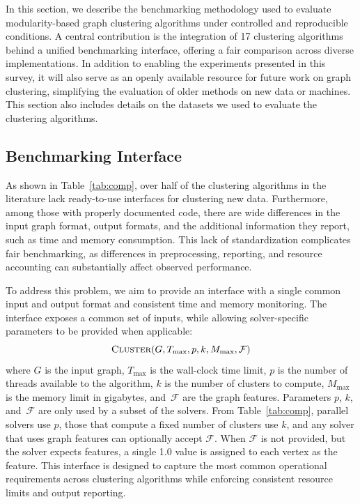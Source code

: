 \documentclass[../paper.tex]{subfiles}
\begin{document}
In this section, we describe the benchmarking methodology used to evaluate modularity-based graph clustering algorithms under controlled and reproducible conditions. A central contribution is the integration of 17 clustering algorithms behind a unified benchmarking interface, offering a fair comparison across diverse implementations. In addition to enabling the experiments presented in this survey, it will also serve as an openly available resource for future work on graph clustering, simplifying the evaluation of older methods on new data or machines. This section also includes details on the datasets we used to evaluate the clustering algorithms.

\subsection{Benchmarking Interface}

As shown in Table~\ref{tab:comp}, over half of the clustering algorithms in the literature lack ready-to-use interfaces for clustering new data. Furthermore, among those with properly documented code, there are wide differences in the input graph format, output formats, and the additional information they report, such as time and memory consumption. This lack of standardization complicates fair benchmarking, as differences in preprocessing, reporting, and resource accounting can substantially affect observed performance.

To address this problem, we aim to provide an interface with a single common input and output format and consistent time and memory monitoring. The interface exposes a common set of inputs, while allowing solver-specific parameters to be provided when applicable:
\[\textsc{Cluster}(G, T_{\max}, p, k, M_{\max}, \mathcal{F})\]
where $G$ is the input graph, $T_{\max}$ is the wall-clock time limit, $p$ is the number of threads available to the algorithm, $k$ is the number of clusters to compute, $M_{\max}$ is the memory limit in gigabytes, and~$\mathcal{F}$ are the graph features. Parameters $p$, $k$, and~$\mathcal{F}$ are only used by a subset of the solvers. From Table~\ref{tab:comp}, parallel solvers use $p$, those that compute a fixed number of clusters use $k$, and any solver that uses graph features can optionally accept $\mathcal{F}$. When $\mathcal{F}$ is not provided, but the solver expects features, a single 1.0 value is assigned to each vertex as the feature. This interface is designed to capture the most common operational requirements across clustering algorithms while enforcing consistent resource limits and output reporting.
\end{document}
